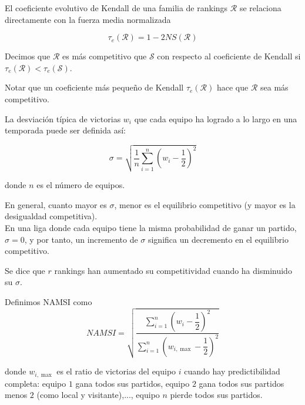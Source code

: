 \begin{nota}
El coeficiente evolutivo de Kendall de una familia de rankings $\mathcal{R}$ se relaciona directamente con la fuerza media normalizada 

\[\tau_e(\mathcal{R}) = 1 - 2NS(\mathcal{R}) \]
\end{nota}

\begin{defi}
Decimos que $\mathcal{R}$ es más competitivo que $\mathcal{S}$ con respecto al coeficiente de Kendall si $\tau_e(\mathcal{R}) < \tau_e(\mathcal{S})$.
\end{defi}

\begin{nota}
Notar que un coeficiente más pequeño de Kendall $\tau_e(\mathcal{R})$ hace que $\mathcal{R}$ sea más competitivo.
\end{nota}

\begin{defi}
La desviación típica de victorias $w_i$ que cada equipo ha logrado a lo largo en una temporada puede ser definida así:

\[ \sigma = \sqrt{\dfrac{1}{n} \sum_{i=1}^{n}\left(w_i - \dfrac{1}{2}\right)^2 } \]

donde $n$ es el número de equipos.
\end{defi}

\begin{nota}
En general, cuanto mayor es $\sigma$, menor es el equilibrio competitivo (y mayor es la desigualdad competitiva).\\

En una liga donde cada equipo tiene la misma probabilidad de ganar un partido, $\sigma = 0$, y por tanto, un incremento de $\sigma$ significa un decremento en el equilibrio competitivo.
\end{nota}

\begin{defi}
Se dice que $r$ rankings han aumentado su competitividad cuando ha disminuido su $\sigma$.
\end{defi}

\begin{defi}
Definimos NAMSI como 
\[ NAMSI =  \sqrt{\dfrac{\sum\limits_{i=1}^{n} \left( w_i - \dfrac{1}{2} \right)^2}{\sum\limits_{i=1}^{n} \left(w_{i, \max} -\dfrac{1}{2}\right)^2}} \]

donde $w_{i, \max}$ es el ratio de victorias del equipo $i$ cuando hay predictibilidad completa: equipo $1$ gana todos sus partidos, equipo $2$ gana todos sus partidos menos $2$ (como local y visitante),..., equipo $n$ pierde todos sus partidos. 

\end{defi}

